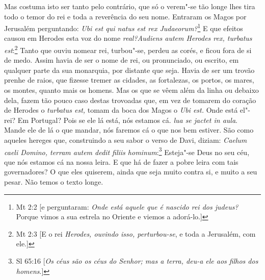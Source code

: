 Mas costuma isto ser tanto pelo contrário, que só o verem"-se tão longe
lhes tira todo o temor do rei e toda a reverência do seu nome. Entraram
os Magos por Jerusalém perguntando: \emph{Ubi est qui natus est rex
Judaeorum?}\footnote{Mt 2:2 [e perguntaram: \emph{Onde está aquele que é nascido rei dos judeus?} Porque vimos a sua estrela no Oriente e viemos a adorá-lo.]} E que efeitos causou em Herodes esta voz do nome
\emph{real?Audiens autem Herodes rex, turbatus est}:\footnote{Mt 2:3 [E o rei \emph{Herodes, ouvindo isso, perturbou-se}, e toda a Jerusalém, com ele.]} Tanto que
ouviu nomear rei, turbou"-se, perdeu as corés, e ficou fora de si de
medo. Assim havia de ser o nome de rei, ou pronunciado, ou escrito,
em qualquer parte da sua monarquia, por distante que seja. Havia de ser
um trovão prenhe de raios, que fizesse tremer as cidades, as fortalezas,
os portos, os mares, os montes, quanto mais os homens. Mas os que se
vêem além da linha ou debaixo dela, fazem tão pouco caso destas
trovoadas que, em vez de tomarem do coração de Herodes o \emph{turbatus
est,} tomam da boca dos Magos o \emph{Ubi est.} Onde está el"-rei? Em
Portugal? Pois se ele lá está, nós estamos cá. \emph{lua se jactet in
aula}. Mande ele de lá o que mandar, nós faremos cá o que
nos bem estiver. São como aqueles hereges que, construindo a seu sabor o
verso de Davi, diziam: \emph{Caelum caeli Domino, terram autem dedit
filiis hominum}:\footnote{Sl 65:16 [\emph{Os céus são os céus do Senhor; mas a terra, deu-a ele aos filhos dos homens}.]} Esteja"-se Deus no seu céu, que nós estamos
cá na nossa leira. E que há de fazer a pobre leira com tais
governadores? O que eles quiserem, ainda que seja muito contra si, e
muito a seu pesar. Não temos o texto longe.

